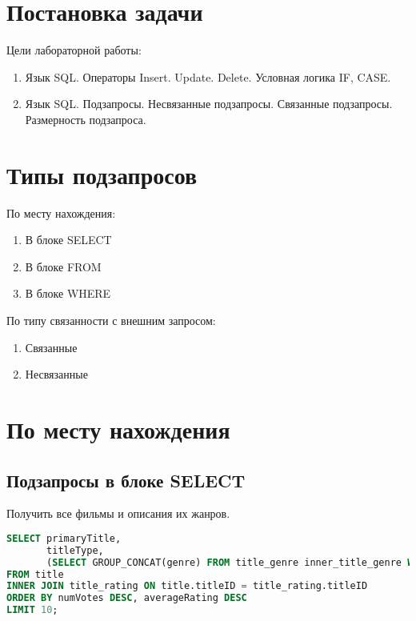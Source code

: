 \documentclass[12pt,a4paper]{article}
\begin{document}
\section{Постановка задачи}
Цели лабораторной работы:
\begin{enumerate}
    \item Язык SQL. Операторы Insert. Update. Delete. Условная логика IF, CASE.
    \item Язык SQL. Подзапросы. Несвязанные подзапросы. Связанные подзапросы. Размерность подзапроса.
\end{enumerate}
\section{Типы подзапросов}
По месту нахождения:
\begin{enumerate}
    \item В блоке SELECT
    \item В блоке FROM 
    \item В блоке WHERE
\end{enumerate}
По типу связанности с внешним запросом:
\begin{enumerate}
    \item Связанные
    \item Несвязанные
\end{enumerate}
\section{По месту нахождения}
\subsection{Подзапросы в блоке SELECT}

Получить все фильмы и описания их жанров.

\begin{lstlisting}[language=SQL]
SELECT primaryTitle, 
	   titleType,
	   (SELECT GROUP_CONCAT(genre) FROM title_genre inner_title_genre WHERE inner_title_genre.titleID = title.titleID) as genres_description
FROM title
INNER JOIN title_rating ON title.titleID = title_rating.titleID
ORDER BY numVotes DESC, averageRating DESC
LIMIT 10;
\end{lstlisting}
\end{document}
